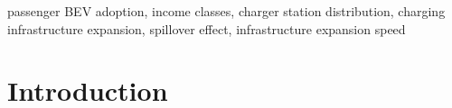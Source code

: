 \documentclass[preprint,review,11pt, authoryear]{elsarticle}
\begin{document}
\begin{frontmatter}
\begin{keyword}
       passenger BEV adoption, income classes, charger station distribution, charging infrastructure expansion, spillover effect, infrastructure expansion speed
\end{keyword}
\end{frontmatter}



\section{Introduction} 
\end{document}
